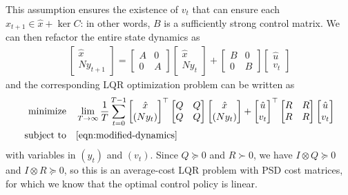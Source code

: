 \documentclass[12pt]{article}
\begin{document}
This assumption ensures the existence of \(v_t\)
that can ensure each \(x_{t + 1} \in \hat{x} + \ker C\):
in other words, \(B\) is a sufficiently strong control matrix.
We can then refactor the entire state dynamics as
\begin{align}
  \begin{bmatrix} \hat{x} \\ N y_{t + 1} \end{bmatrix}
    = \begin{bmatrix} A & 0 \\ 0 & A \end{bmatrix}
      \begin{bmatrix} \hat{x} \\ N y_{t} \end{bmatrix}
      + \begin{bmatrix} B & 0 \\ 0 & B \end{bmatrix}
        \begin{bmatrix} \hat{u} \\ v_t \end{bmatrix}
  \label{eqn:modified-dynamics}
\end{align}
and the corresponding LQR optimization problem can be written as
\begin{align*}
  \text{minimize}
    &\quad \lim_{T \to \infty} \frac{1}{T}
      \sum_{t = 0}^{T - 1}
        \begin{bmatrix} \hat{x} \\ (N y_t) \end{bmatrix} ^\top
        \begin{bmatrix} Q & Q \\ Q & Q \end{bmatrix}
        \begin{bmatrix} \hat{x} \\ (N y_t) \end{bmatrix}
        +
        \begin{bmatrix} \hat{u} \\ v_t \end{bmatrix}^\top
        \begin{bmatrix} R & R \\ R & R \end{bmatrix}
        \begin{bmatrix} \hat{u} \\ v_t \end{bmatrix} \\
  \text{subject to}
    &\quad \eqref{eqn:modified-dynamics}
\end{align*}
with variables in \((y_t)\) and \((v_t)\).
Since \(Q \succeq 0\) and \(R \succ 0\), we have \(I \otimes Q \succeq 0\)
and \(I \otimes R \succeq 0\),
so this is an average-cost LQR problem with PSD cost matrices,
for which we know that the optimal control policy is linear.


\printbibliography
\end{document}

